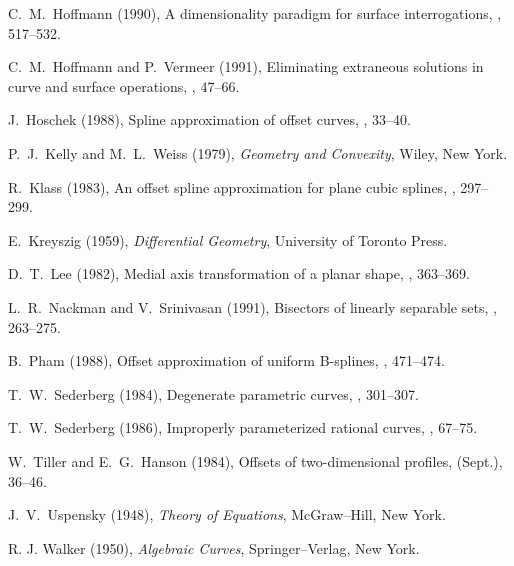 \begin{thebibliography}{99}
C.~M.~Hoffmann (1990), A dimensionality paradigm for surface interrogations,
, 517--532.

C.~M.~Hoffmann and P.~Vermeer (1991), Eliminating extraneous solutions in
curve and surface operations, , 47--66.


J.~Hoschek (1988), Spline approximation of offset curves, ,
33--40.

P.~J.~Kelly and M.~L.~Weiss (1979), {\it Geometry and Convexity}, Wiley,
New York.

R.~Klass (1983), An offset spline approximation for plane cubic splines,
, 297--299.

E.~Kreyszig (1959), {\it Differential Geometry}, University of Toronto
Press.

D.~T.~Lee (1982), Medial axis transformation of a planar shape,
, 363--369.

L.~R.~Nackman and V.~Srinivasan (1991), Bisectors of linearly separable
sets, , 263--275.

B.~Pham (1988), Offset approximation of uniform B-splines, ,
471--474.



T.~W.~Sederberg (1984), Degenerate parametric curves, ,
301--307.

T.~W.~Sederberg (1986), Improperly parameterized rational curves,
, 67--75.


W.~Tiller and E.~G.~Hanson (1984), Offsets of two-dimensional profiles,
 (Sept.), 36--46.

J.~V.~Uspensky (1948), {\it Theory of Equations}, McGraw--Hill,
New York.

R. J. Walker (1950), {\it Algebraic Curves}, Springer--Verlag, New York.


\end{thebibliography}
